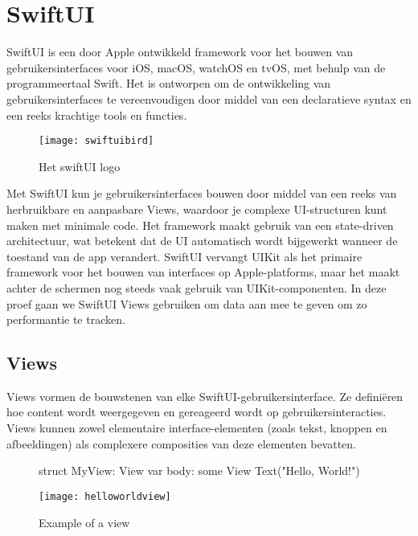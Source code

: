 \section{SwiftUI}
\autocite{AppleSwiftUI} SwiftUI is een door Apple ontwikkeld framework voor het bouwen van gebruikersinterfaces voor iOS, macOS, watchOS en tvOS, met behulp van de programmeertaal Swift. Het is ontworpen om de ontwikkeling van gebruikersinterfaces te vereenvoudigen door middel van een declaratieve syntax en een reeks krachtige tools en functies. 
\begin{wrapfigure}{r}{0.3\textwidth}
    \texttt{[image: swiftuibird]} 
    \caption{Het swiftUI logo}
    \label{fig:swiftUI}
\end{wrapfigure}
Met SwiftUI kun je gebruikersinterfaces bouwen door middel van een reeks van herbruikbare en aanpasbare Views, waardoor je complexe UI-structuren kunt maken met minimale code. Het framework maakt gebruik van een state-driven architectuur, wat betekent dat de UI automatisch wordt bijgewerkt wanneer de toestand van de app verandert. SwiftUI vervangt UIKit als het primaire framework voor het bouwen van interfaces op Apple-platforms, maar het maakt achter de schermen nog steeds vaak gebruik van UIKit-componenten. In deze proef gaan we SwiftUI Views gebruiken om data aan mee te geven om zo performantie te tracken.


\subsection{Views}
\autocite{AppleSwiftViews} Views vormen de bouwstenen van elke SwiftUI-gebruikersinterface. Ze definiëren hoe content wordt weergegeven en gereageerd wordt op gebruikersinteracties. Views kunnen zowel elementaire interface-elementen (zoals tekst, knoppen en afbeeldingen) als complexere composities van deze elementen bevatten.

\begin{figure}[h]
    \begin{minipage}{0.5\textwidth}
        \begin{swift}[caption=Example of a view, label=view_example]
           struct MyView: View {
               var body: some View {
                   Text("Hello, World!")
               }
           }
        \end{swift}
    \end{minipage}%
    \hfill
    \begin{minipage}{0.45\textwidth}
        \centering
        \texttt{[image: helloworldview]}
        \caption{Example of a view}
        \label{fig:viewex1}
    \end{minipage}
\end{figure}

